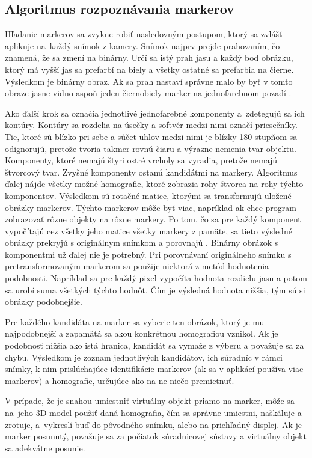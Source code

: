 \subsection{Algoritmus rozpoznávania markerov}

Hľadanie markerov sa zvykne robiť nasledovným postupom, ktorý sa zvlášť aplikuje na~každý snímok z kamery. Snímok najprv prejde prahovaním, čo znamená, že sa zmení na binárny. Určí sa istý prah jasu a každý bod obrázku, ktorý má vyšší jas sa prefarbí na biely a všetky ostatné sa prefarbia na čierne. Výsledkom je binárny obraz. Ak sa prah nastaví správne malo by byť v tomto obraze jasne vidno aspoň jeden čiernobiely marker na jednofarebnom pozadí \cite{Kato99}.

Ako ďalší krok sa označia jednotlivé jednofarebné komponenty a~zdetegujú sa ich kontúry. Kontúry sa rozdelia na úsečky a softvér medzi nimi označí priesečníky. Tie, ktoré sú blízko pri sebe a súčet uhlov medzi nimi je blízky 180 stupňom sa odignorujú, pretože tvoria takmer rovnú čiaru a výrazne nemenia tvar objektu. Komponenty, ktoré nemajú štyri ostré vrcholy sa vyradia, pretože nemajú štvorcový tvar. Zvyšné komponenty ostanú kandidátmi na markery. Algoritmus ďalej nájde všetky možné homografie, ktoré zobrazia rohy štvorca na rohy týchto komponentov. Výsledkom sú rotačné matice, ktorými sa transformujú uložené obrázky markerov. Týchto markerov môže byť viac, napríklad ak chce program zobrazovať rôzne objekty na rôzne markery. Po tom, čo sa pre každý komponent vypočítajú cez všetky jeho matice všetky markery z pamäte, sa tieto výsledné obrázky prekryjú s originálnym snímkom a porovnajú \cite{ARToolKit-a}. Binárny obrázok s komponentmi už ďalej nie je potrebný. Pri porovnávaní originálneho snímku s pretransformovaným markerom sa použije niektorá z metód hodnotenia podobnosti. Napríklad sa pre každý pixel vypočíta hodnota rozdielu jasu a potom sa urobí suma všetkých týchto hodnôt. Čím je výsledná hodnota nižšia, tým sú si obrázky podobnejšie.

Pre každého kandidáta na marker sa vyberie ten obrázok, ktorý je mu najpodobnejší a zapamätá sa akou konkrétnou homografiou vznikol. Ak je podobnosť nižšia ako istá hranica, kandidát sa vymaže z výberu a považuje sa za chybu. Výsledkom je zoznam jednotlivých kandidátov, ich súradníc v rámci snímky, k nim prislúchajúce identifikácie markerov (ak sa v aplikácí používa viac markerov) a homografie, určujúce ako na ne niečo premietnuť.

V prípade, že je snahou umiestniť virtuálny objekt priamo na marker, môže sa na~jeho 3D model použiť daná homografia, čím sa správne umiestni, naškáluje a zrotuje, a~vykreslí buď do pôvodného snímku, alebo na priehľadný displej. Ak je marker posunutý, považuje sa za počiatok súradnicovej sústavy a virtuálny objekt sa adekvátne posunie.

